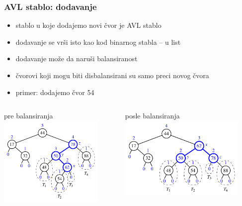 \documentclass[compress,aspectratio=169]{beamer}
\begin{document}
\begin{frame}[fragile]
  \frametitle{AVL stablo: dodavanje}
  \begin{itemize}
    \item stablo u koje dodajemo novi čvor je AVL stablo
    \item dodavanje se vrši isto kao kod binarnog stabla -- u list
    \item dodavanje može da naruši balansiranost
    \item čvorovi koji mogu biti disbalansirani su samo preci novog čvora
    \item primer: dodajemo čvor 54
  \end{itemize}
  \begin{columns}
    \begin{column}[t]{6cm}
        pre balansiranja 
        \includegraphics[width=5cm]{asp-11-pic15a.pdf}
    \end{column}  
    \begin{column}[t]{6cm}
        posle balansiranja
        \includegraphics[width=6cm]{asp-11-pic15b.pdf}
    \end{column}  
  \end{columns}
\end{frame}
\end{document}
